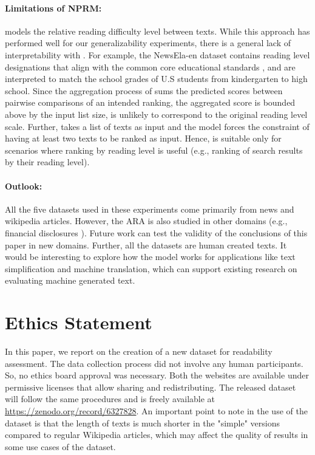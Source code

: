 \documentclass[11pt]{article}
\begin{document}
\paragraph{Limitations of NPRM: }  models the relative reading difficulty level between texts.  While this approach has performed well for our generalizability experiments, there is a general lack of interpretability with . For example, the NewsEla-en dataset contains reading level designations that align with the common core educational standards \cite{Porter.McMaken.ea-11}, and are interpreted to match the school grades of U.S students from kindergarten to high school. Since the aggregation process of  sums the predicted scores between pairwise comparisons of an intended ranking, the aggregated score is bounded above by the input list size, is unlikely to correspond to the original reading level scale. Further,  takes a list of texts as input and the model forces the constraint of having at least two texts to be ranked as input. Hence,  is suitable only for scenarios where ranking by reading level is useful (e.g., ranking of search results by their reading level).

\paragraph{Outlook: }All the five datasets used in these experiments come primarily from news and wikipedia articles. However, the ARA is also studied in other domains (e.g., financial disclosures \cite{Loughran.McDonald-14}). Future work can test the validity of the conclusions of this paper in new domains. Further, all the datasets are human created texts. It would be interesting to explore how the model works for applications like text simplification and machine translation, which can support existing research on evaluating machine generated text. 

\section*{Ethics Statement}
In this paper, we report on the creation of a new dataset for readability assessment. The data collection process did not involve any human participants. So, no ethics board approval was necessary. Both the websites are available under permissive licenses that allow sharing and redistributing. The released dataset will follow the same procedures and is freely available at \url{https://zenodo.org/record/6327828}. An important point to note in the use of the dataset is that the length of texts is much shorter in the "simple" versions compared to regular Wikipedia articles, which may affect the quality of results in some use cases of the dataset. 
\end{document}

